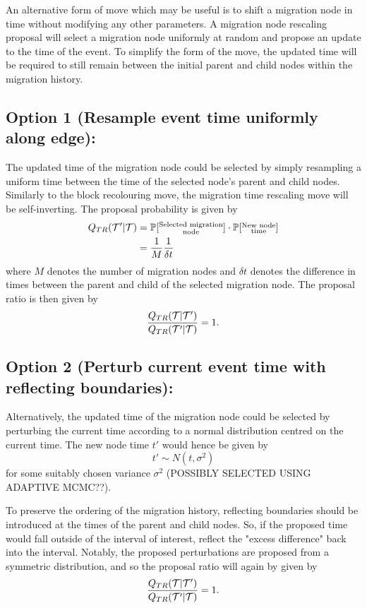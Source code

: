 An alternative form of move which may be useful is to shift a migration node in time without modifying any other parameters. A migration node rescaling proposal will select a migration node uniformly at random and propose an update to the time of the event. To simplify the form of the move, the updated time will be required to still remain between the initial parent and child nodes within the migration history.

\subsection{Option 1 (Resample event time uniformly along edge):}
	The updated time of the migration node could be selected by simply resampling a uniform time between the time of the selected node's parent and child nodes. Similarly to the block recolouring move, the migration time rescaling move will be self-inverting. The proposal probability is given by
		\begin{align*}
			Q_{TR} (\mathcal{T}' | \mathcal{T}) & = \mathbb{P}[\substack{\text{Selected migration} \\ \text{node}}] \cdot \mathbb{P} [\substack{\text{New node} \\ \text{time}}] \\
				& = \frac{1}{M} \frac{1}{\delta t}
		\end{align*}
	where $M$ denotes the number of migration nodes and $\delta t$ denotes the difference in times between the parent and child of the selected migration node. The proposal ratio is then given by
		\[
			\frac{Q_{TR} (\mathcal{T} | \mathcal{T}')}{Q_{TR} (\mathcal{T}' | \mathcal{T})} = 1.
		\]

\subsection{Option 2 (Perturb current event time with reflecting boundaries):}
	Alternatively, the updated time of the migration node could be selected by perturbing the current time according to a normal distribution centred on the current time. The new node time $t'$ would hence be given by
		\[
			t' \sim N(t, \sigma^2)
		\]
	for some suitably chosen variance $\sigma^2$ (POSSIBLY SELECTED USING ADAPTIVE MCMC??).
	
	To preserve the ordering of the migration history, reflecting boundaries should be introduced at the times of the parent and child nodes. So, if the proposed time would fall outside of the interval of interest, reflect the "excess difference" back into the interval. Notably, the proposed perturbations are proposed from a symmetric distribution, and so the proposal ratio will again by given by
		\[
			\frac{Q_{TR} (\mathcal{T} | \mathcal{T}')}{Q_{TR} (\mathcal{T}' | \mathcal{T})} = 1.
		\]